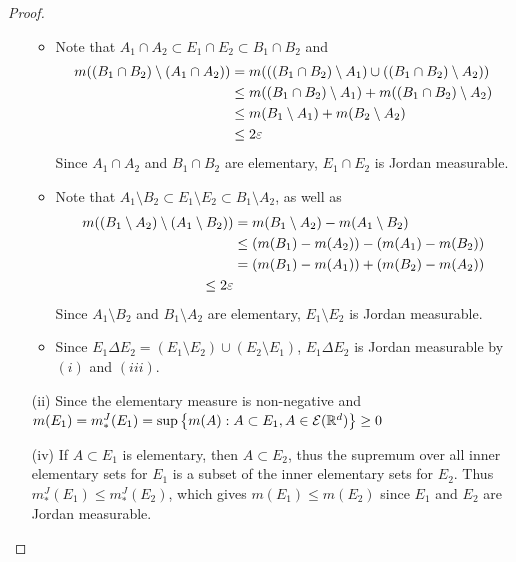 \documentclass[hw_all.tex]{subfiles}
\begin{document}
\begin{proof}
\begin{enumerate}
\begin{itemize}
                \item 
                    Note that $A_1 \cap A_2 \subset E_1 \cap E_2 \subset B_1 \cap B_2$ and
                    \begin{align*}
                        m((B_1 \cap B_2) \setminus (A_1 \cap A_2)) &= m(((B_1 \cap B_2) \setminus A_1) \cup ((B_1 \cap B_2) \setminus A_2)) \\
                                                                   &\leq m((B_1 \cap B_2) \setminus A_1) + m((B_1 \cap B_2) \setminus A_2) \\
                                                                   &\leq m(B_1 \setminus A_1) + m(B_2 \setminus A_2) \\
                                                                   &\leq 2 \eps
                    \end{align*}
                    Since $A_1 \cap A_2$ and $B_1 \cap B_2$ are elementary, $E_1 \cap E_2$ is Jordan measurable.
                \item 
                    Note that $A_1 \setminus B_2 \subset E_1 \setminus E_2 \subset B_1 \setminus A_2$, as well as
                    \begin{align*}
                        m((B_1 \setminus A_2) \setminus (A_1 \setminus B_2)) &= m(B_1 \setminus A_2) - m(A_1 \setminus B_2) \\
                        &\leq (m(B_1) - m(A_2)) - (m(A_1) - m(B_2)) \\
                        &= (m(B_1) - m(A_1)) + (m(B_2) - m(A_2)) \\
                        \leq 2 \eps
                    \end{align*}
                    Since $A_1 \setminus B_2$ and $B_1 \setminus A_2$ are elementary, $E_1 \setminus E_2$ is Jordan measurable.
                \item 
                    Since $E_1 \Delta E_2 = (E_1 \setminus E_2) \cup (E_2 \setminus E_1)$, $E_1 \Delta E_2$ is Jordan measurable by $(i)$ and $(iii)$.
            \end{itemize}

        \item[(ii)] 
            Since the elementary measure is non-negative and $m(E_1) = m^J_*(E_1) = \sup\qty{m(A) : A \subset E_1, A \in \mathcal{E}(\mathbb{R}^d)} \geq 0$

        \item[(iv)] 
            If $A \subset E_1$ is elementary, then $A \subset E_2$, thus the supremum over all inner elementary sets for $E_1$ is a subset of the inner elementary sets for $E_2$. Thus $m^J_*(E_1) \leq m^J_*(E_2)$, which gives $m(E_1) \leq m(E_2)$ since $E_1$ and $E_2$ are Jordan measurable.


\end{enumerate}
\end{proof}
\end{document}
